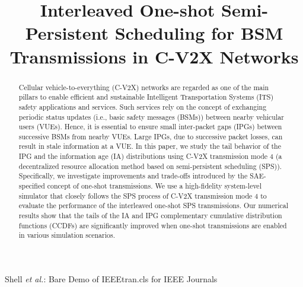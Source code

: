 \documentclass[conference]{IEEEtran}
\begin{document}
\IEEEoverridecommandlockouts
\title{Interleaved One-shot Semi-Persistent Scheduling for BSM Transmissions in C-V2X Networks}
\author{
}  


\markboth{}%
{Shell \MakeLowercase{\textit{et al.}}: Bare Demo of IEEEtran.cls for IEEE Journals}

\maketitle
\vspace{-0.5in}
\begin{abstract}
Cellular vehicle-to-everything (C-V2X) networks are regarded as one of the main pillars to enable efficient and sustainable Intelligent Transportation Systems (ITS) safety applications and services. Such services rely on the concept of exchanging periodic status updates (i.e., basic safety messages (BSMs)) between nearby vehicular users (VUEs). Hence, it is essential to ensure small inter-packet gaps (IPGs) between successive BSMs from nearby VUEs. Large IPGs, due to successive packet losses, can result in stale information at a VUE. In this paper, we study the tail behavior of the IPG and the information age (IA) distributions using C-V2X transmission mode 4 (a decentralized resource allocation method based on semi-persistent scheduling (SPS)). Specifically, we investigate improvements and trade-offs introduced by the SAE-specified concept of one-shot transmissions. We use a high-fidelity system-level simulator that closely follows the SPS process of C-V2X transmission mode 4 to evaluate the performance of the interleaved one-shot SPS transmissions. Our numerical results show that the tails of the IA and IPG complementary cumulative distribution functions (CCDFs) are significantly improved when one-shot transmissions are enabled in various simulation scenarios. 
\end{abstract}
\end{document}
